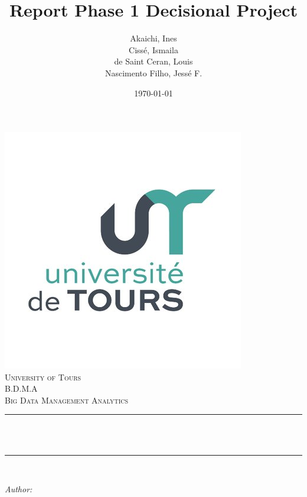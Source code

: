 \documentclass[12pt]{article}
\title{Report Phase 1 Decisional Project}
\author{Akaichi, Ines 
\\Cissé, Ismaila 
\\de Saint Ceran, Louis
\\Nascimento Filho, Jessé F.}
\date{\today}											%
\makeatletter
\let\thetitle\@title
\let\theauthor\@author
\let\thedate\@date
\makeatother
\begin{document}

\begin{titlepage}
	\centering
    \vspace*{0.5 cm}
    \includegraphics[scale = 0.41]{logouniv.jpg}\\[0.1 cm]	%
    \textsc{\LARGE University of Tours}\\[2.0 cm]	%
	\textsc{\Large B.D.M.A}\\[0.5 cm]				%
	\textsc{\large Big Data Management Analytics}\\[0.5 cm]				%
	\rule{\linewidth}{0.2 mm} \\[0.4 cm]
	{ \huge \bfseries \thetitle}\\
	\rule{\linewidth}{0.2 mm} \\[1.5 cm]
	
	\begin{minipage}{0.4\textwidth}
		\begin{flushleft} \large
			\emph{Author:}\\
			\theauthor
			\end{flushleft}
			\end{minipage}~
			\begin{minipage}{0.4\textwidth}
			\begin{flushright} \large
		\end{flushright}
	\end{minipage}\\[2 cm]
	
	{\large \thedate}\\[2 cm]
 
	\vfill
	
\end{titlepage}
\end{document}
